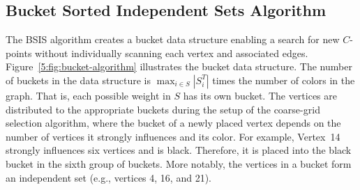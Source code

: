 \documentclass{elsart}
\begin{document}
\subsection{Bucket Sorted Independent Sets Algorithm}
The BSIS algorithm creates a bucket data structure enabling a search
for new $C$-points without individually scanning each vertex and
associated edges. Figure~\ref{5:fig:bucket-algorithm} illustrates the
bucket data structure. The number of buckets in the data structure is
$\max_{i \in S}|S_i^T|$ times the number of colors in the graph. That
is, each possible weight in $S$ has its own bucket. The vertices are
distributed to the appropriate buckets during the setup of the
coarse-grid selection algorithm, where the bucket of a newly placed
vertex depends on the number of vertices it strongly influences and
its color. For example, Vertex~14 strongly influences six vertices and
is black. Therefore, it is placed into the black bucket in the sixth
group of buckets. More notably, the vertices in a bucket form an
independent set (e.g., vertices 4, 16, and 21).
\end{document}
